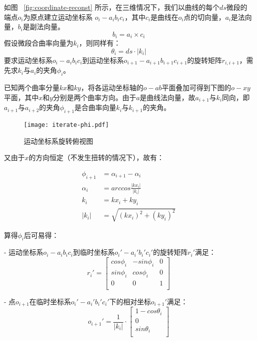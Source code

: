 如图 ~\ref{fig:coordinate-reconst} 所示，在三维情况下，我们以曲线的每个$ds$微段的端点$o_i$为原点建立运动坐标系 $o_i-a_ib_ic_i$，其中$c_i$是曲线在$o_i$点的切向量，$a_i$是法向量，$b_i$是副法向量。
\begin{equation}
b_i = a_i \times c_i
\end{equation}
假设微段合曲率向量为$k_i$，则同样有：
\begin{equation}
\theta_i = ds\cdot |k_i|
\end{equation}
要求运动坐标系$o_i-a_ib_ic_i$到运动坐标系$o_{i+1}-a_{i+1}b_{i+1}c_{i+1}$的旋转矩阵$r_{i, i+1}$，需先求$k_i$与$a_i$的夹角$\phi_i$。

已知两个曲率分量$kx$和$ky$，将各运动坐标轴的$o-ab$平面叠加可得到下图的$o-xy$平面，其中$x$和$y$分别是两个曲率方向。由于$a$是曲线法向量，故$a_{i+1}$与$k_i$同向，即$a_{i+1}$与$a_{i+2}$的夹角$\phi_{i+1}$是合曲率向量$k_i$与$k_{i+1}$的夹角。

\begin{figure}
\centering
\texttt{[image: iterate-phi.pdf]}
\caption{运动坐标系旋转俯视图}
\label{fig:iterate-phi} 
\end{figure}

又由于$x$的方向恒定（不发生扭转的情况下），故有：

\begin{align}
\phi_{i+1} &= \alpha_{i+1} - \alpha_i \\
\alpha_i &= arccos\frac{|kx_i|}{|k_i|} \\
k_i &= kx_i + ky_i \\
|k_i| &= \sqrt{(kx_i)^2 + (ky_i)^2}
\end{align}

算得$\phi_i$后可易得：

- 运动坐标系$o_i-a_ib_ic_i$到临时坐标系$o_i'-a_i'b_i'c_i'$的旋转矩阵$r_i'$满足：
    \begin{equation}
    r_i' = \left[
            \begin{matrix}
            cos\phi_i & -sin\phi_i & 0\\
            sin\phi_i & cos\phi_i & 0\\
            0 & 0 & 1\\
            \end{matrix}
        \right]
    \end{equation}
    
- 点$o_{i+1}$在临时坐标系$o_i'-a_i'b_i'c_i'$下的相对坐标$o_{i+1}'$满足：
    \begin{equation}
    o_{i+1}' = \frac{1}{|k_i|} \cdot \left[
      \begin{matrix}
    	1 - cos\theta_i\\
    	0 \\
      sin\theta_i\\
      \end{matrix}
    \right]
    \end{equation}
    
